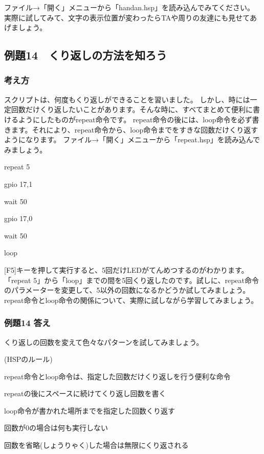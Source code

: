 ファイル→「開く」メニューから「handan.hsp」を読み込んでみてください。
実際に試してみて、文字の表示位置が変わったらTAや周りの友達にも見せてあげましょう。

\clearpage
\subsection{例題14　くり返しの方法を知ろう}

\subsubsection*{考え方}

スクリプトは、何度もくり返しができることを習いました。
しかし、時には一定回数だけくり返したいことがあります。そんな時に、すべてまとめて便利に書けるようにしたものがrepeat命令です。
repeat命令の後には、loop命令を必ず書きます。それにより、repeat命令から、loop命令までをすきな回数だけくり返すようになります。
ファイル→「開く」メニューから「repeat.hsp」を読み込んでみましょう。

\begin{description}
    \item repeat 5
    \item gpio 17,1
    \item wait 50
    \item gpio 17,0
    \item wait 50
    \item loop
\end{description}

[F5]キーを押して実行すると、5回だけLEDがてんめつするのがわかります。
「repeat
5」から「loop」までの間を5回くり返したのです。試しに、repeat命令のパラメーターを変更して、5以外の回数になるかどうか試してみましょう。
repeat命令とloop命令の関係について、実際に試しながら学習してみましょう。

\subsubsection*{例題14 答え}

くり返しの回数を変えて色々なパターンを試してみましょう。

\begin{description}
    \item (HSPのルール)
\end{description}

\begin{description}
    \item repeat命令とloop命令は、指定した回数だけくり返しを行う便利な命令
    \item repeatの後にスペースに続けてくり返し回数を書く
    \item loop命令が書かれた場所までを指定した回数くり返す
    \item 回数が0の場合は何も実行しない
    \item 回数を省略(しょうりゃく)した場合は無限にくり返される
\end{description}

